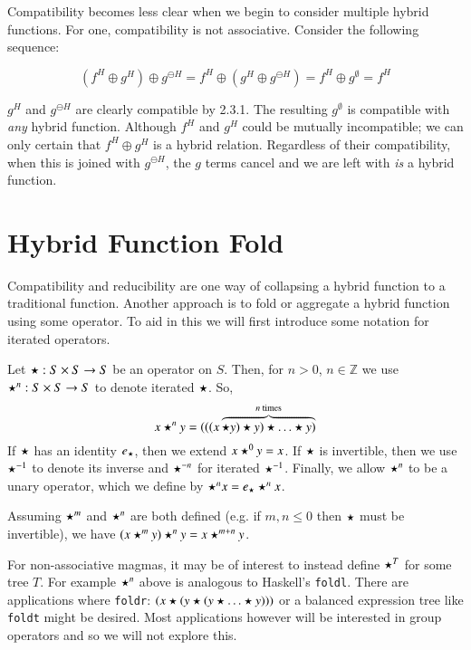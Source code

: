 Compatibility becomes less clear when we begin to consider multiple hybrid functions.
For one, compatibility is not associative.
Consider the following sequence:


\begin{equation}
(f^H \oplus g^H) \oplus g^{\ominus H} = f^H \oplus (g^H \oplus g^{\ominus H}) = f^H \oplus g^\emptyset = f^H
\end{equation}

$g^H$ and $g^{\ominus H}$ are clearly compatible by 2.3.1.
The resulting $g^{\emptyset}$ is compatible with \emph{any} hybrid function.
Although $f^H$ and $g^H$ could be mutually incompatible; 
we can only certain that $f^H \oplus g^H$ is a hybrid relation.
Regardless of their compatibility, when this is joined with $g^{\ominus H}$, the $g$ terms cancel
and we are left with \emph{is} a hybrid function.





\section{Hybrid Function Fold}


Compatibility and reducibility are one way of collapsing a hybrid function to a traditional function.
Another approach is to fold or aggregate a hybrid function using some operator.
To aid in this we will first introduce some notation for iterated operators.
\begin{definition}
	Let $\star : S \times S \to S$ be an operator on $S$.
	Then, for $n > 0$, $n \in \mathbb{Z}$ we use $\star^n:S \times S \to S$ to denote iterated $\star$.
	So,
	\begin{equation}
		x \star^n y = (((x \overbrace{\star y) \star y) \star \ldots \star y)}^{n \text{ times}}
	\end{equation}
	If $\star$ has an identity $e_\star$, then we extend $x \star^0 y = x$.
	If $\star$ is invertible, then we use $\star^{-1}$ to denote its inverse and $\star^{-n}$ for iterated $\star^{-1}$.
	Finally, we allow $\star^n$ to be a unary operator, which we define by $\star^n x = e_\star \star^n x$.
\end{definition}

Assuming $\star^m$ and $\star^n$ are both defined (e.g. if $m,n \leq 0$ then $\star$ must be invertible),
we have $ ( x \star^m y ) \star^n y = x \star^{m+n} y$.

For non-associative magmas, it may be of interest to instead define $\star^T$ for some tree $T$. 
For example $\star^n$ above is analogous to Haskell's \texttt{foldl}.
There are applications where \texttt{foldr}: $(x \star ( y \star ( y \star \ldots \star y)))$ or a balanced expression tree like \texttt{foldt} might be desired.
Most applications however will be interested in group operators and so we will not explore this.

